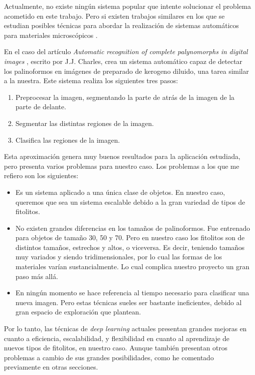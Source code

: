 

Actualmente, no existe ningún sistema popular que intente solucionar el problema acometido en este trabajo. Pero si existen trabajos similares en los que se estudian posibles técnicas para abordar la realización de sistemas automáticos para materiales microscópicos \cite{palyrecog}.

En el caso del artículo \textit{Automatic recognition of complete palynomorphs in digital images} \cite{palyrecog}, escrito por J.J. Charles, crea un sistema automático capaz de detectar los palinoformos en imágenes de preparado de kerogeno diluido, una tarea similar a la nuestra. Este sistema realiza los siguientes tres pasos:

\begin{enumerate}
	\item Preprocesar la imagen, segmentando la parte de atrás de la imagen de la parte de delante.
	\item Segmentar las distintas regiones de la imagen.
	\item Clasifica las regiones de la imagen.
\end{enumerate}

Esta aproximación genera muy buenos resultados para la aplicación estudiada, pero presenta varios problemas para nuestro caso. Los problemas a los que me refiero son los siguientes:

\begin{itemize}
	\item Es un sistema aplicado a una única clase de objetos. En nuestro caso, queremos que sea un sistema escalable debido a la gran variedad de tipos de fitolitos.
	\item No existen grandes diferencias en los tamaños de palinoformos. Fue entrenado para objetos de tamaño 30, 50 y 70. Pero en nuestro caso los fitolitos son de distintos tamaños, estrechos y altos, o viceversa. Es decir, teniendo tamaños muy variados y siendo tridimensionales, por lo cual las formas de los materiales varían sustancialmente. Lo cual complica nuestro proyecto un gran paso más allá.
	\item En ningún momento se hace referencia al tiempo necesario para clasificar una nueva imagen. Pero estas técnicas sueles ser bastante ineficientes, debido al gran espacio de exploración que plantean.
\end{itemize}

Por lo tanto, las técnicas de \textit{deep learning} actuales presentan grandes mejoras en cuanto a eficiencia, escalabilidad, y flexibilidad en cuanto al aprendizaje de nuevos tipos de fitolitos, en nuestro caso. Aunque también presentan otros problemas a cambio de sus grandes posibilidades, como he comentado previamente en otras secciones.